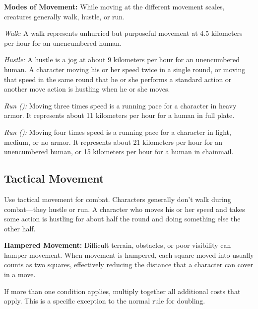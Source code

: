 \textbf{Modes of Movement:} While moving at the different movement scales, creatures generally walk, hustle, or run.

\textit{Walk:} A walk represents unhurried but purposeful movement at 4.5 kilometers per hour for an unencumbered human.

\textit{Hustle:} A hustle is a jog at about 9 kilometers per hour for an unencumbered human. A character moving his or her speed twice in a single round, or moving that speed in the same round that he or she performs a standard action or another move action is hustling when he or she moves.

\textit{Run ():} Moving three times speed is a running pace for a character in heavy armor. It represents about 11 kilometers per hour for a human in full plate.

\textit{Run ():} Moving four times speed is a running pace for a character in light, medium, or no armor. It represents about 21 kilometers per hour for an unencumbered human, or 15 kilometers per hour for a human in chainmail.

\subsection{Tactical Movement}
Use tactical movement for combat. Characters generally don't walk during combat---they hustle or run. A character who moves his or her speed and takes some action is hustling for about half the round and doing something else the other half.


\textbf{Hampered Movement:} Difficult terrain, obstacles, or poor visibility can hamper movement. When movement is hampered, each square moved into usually counts as two squares, effectively reducing the distance that a character can cover in a move.

If more than one condition applies, multiply together all additional costs that apply. This is a specific exception to the normal rule for doubling.


